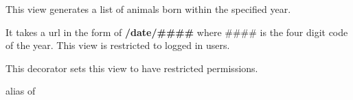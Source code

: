 \documentclass[letterpaper,10pt,english]{sphinxmanual}
\begin{document}
\begin{fulllineitems}
\label{animals:mousedb.animal.views.AnimalYearArchive}
This view generates a list of animals born within the specified year.

It takes a url in the form of \textbf{/date/\#\#\#\#} where \#\#\#\# is the four digit code of the year.
This view is restricted to logged in users.

\begin{fulllineitems}
\label{animals:mousedb.animal.views.AnimalYearArchive.dispatch}
This decorator sets this view to have restricted permissions.

\end{fulllineitems}


\begin{fulllineitems}
\label{animals:mousedb.animal.views.AnimalYearArchive.model}
alias of 

\end{fulllineitems}


\end{fulllineitems}

\end{document}
